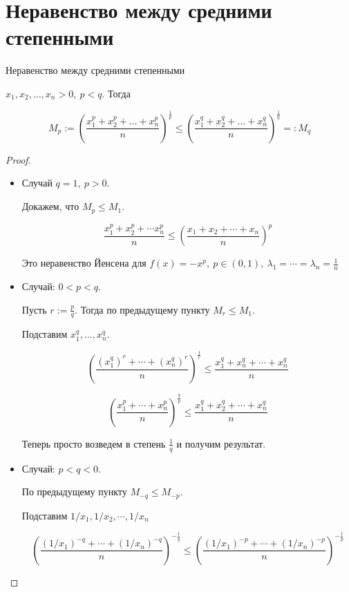 \section{Неравенство между средними степенными \href{https://youtu.be/p9C57KDo1Yg?t=403}{\Walley}}
\begin{theorem-non}
    Неравенство между средними степенными

    $x_1, x_2, \dots, x_n > 0,\ p<q$. Тогда

    \[M_p:=\left(\frac{x_1^p+x_2^p+ \dots+x_n^p}{n}\right)^\frac{1}{p} \leqslant 
    \left(\frac{x_1^q+x_2^q+\dots+x_n^q}{n}\right)^\frac{1}q =: M_q\]
\end{theorem-non}

\begin{proof}
    \quad \\
    \begin{itemize} 
        \item Случай $q = 1,\ p>0$. 
        
        Докажем, что $M_p \leqslant M_1$.

        \[\frac{x_1^p+x_2^p+\cdots x_n^p}{n} \leqslant \left(\frac{x_1+x_2+\cdots+x_n}{n}\right)^p\]
    
        Это неравенство Йенсена для $f(x) = -x^p,\ p\in (0, 1),\ \lambda_1=\cdots=\lambda_n=\frac{1}{n}$
        \item Случай: $0 < p < q$. 
        
        Пусть $r:=\frac{p}{q}$. Тогда по предыдущему пункту $M_r \leqslant M_1$.
        
        Подставим $x_1^q,\dots, x_n^q$.
    
        \[\left(\frac{(x_1^q)^r+\cdots+(x_n^q)^r}{n}\right  )^\frac{1}{r} \leqslant
        \frac{x_1^q+x_n^q+\cdots+x_n^q}{n}\]
    
        \[\left(\frac{x_1^p+\cdots+x_n^p}{n}\right)^\frac{q}{p} \leqslant
        \frac{x_1^q+x_2^q+\cdots+x_n^q}{n}\]
    
        Теперь просто возведем в степень $\frac{1}{q}$ и получим результат.
        \item Случай: $p < q < 0$.
        
        По предыдущему пункту $M_{-q} \leqslant M_{-p}$. 
        
        Подставим $1/x_1, 1/x_2,\cdots, 1/x_n$

        \[ \left(\frac{(1/x_1)^{-q}+\cdots+(1/x_n)^{-q}}{n}\right)^{-\frac{1}{q}} \leqslant
        \left(\frac{(1/x_1)^{-p} + \cdots + (1/x_n)^{-p} }{n}\right)^{-\frac{1}{p}} \]
    

\end{itemize}
\end{proof}

